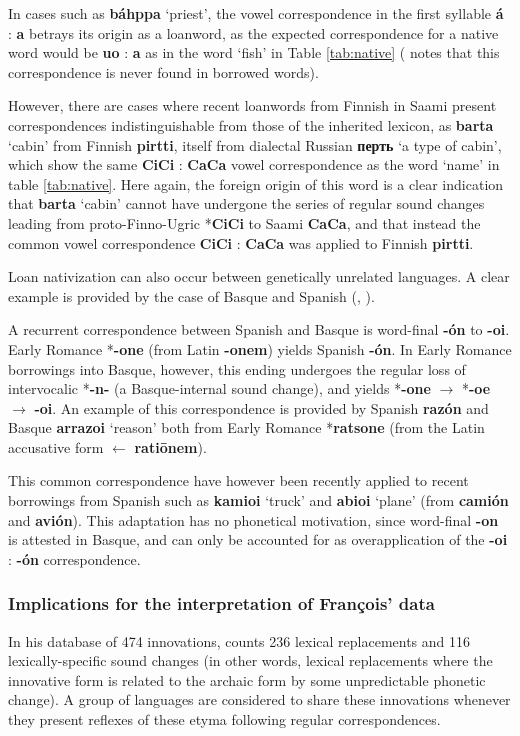 \documentclass[svgnames,12pt]{scrartcl}
\newcommand{\ipa}[1]{\textbf{{\phon\mbox{#1}}}}
\begin{document}
{{In cases such as \ipa{báhppa} `priest', the vowel correspondence in the first syllable \ipa{á} : \ipa{a} betrays its origin as a loanword, as the expected correspondence for a native word would be \ipa{uo} : \ipa{a} as in the word `fish' in Table \ref{tab:native} (\citealt[35]{aikio06nativization} notes that this correspondence is never found in borrowed words).

However, there are cases where recent loanwords from Finnish in Saami present correspondences indistinguishable from those of the inherited lexicon, as \ipa{barta} `cabin' from Finnish \ipa{pirtti}, itself from dialectal Russian \ipa{перть} `a type of cabin', which show the same \ipa{CiCi} : \ipa{CaCa} vowel correspondence as the word `name' in table \ref{tab:native}. Here again, the foreign origin of this word is a clear indication that \ipa{barta} `cabin' cannot have undergone the series of regular sound changes leading from proto-Finno-Ugric *\ipa{CiCi} to Saami \ipa{CaCa}, and that instead the common vowel correspondence \ipa{CiCi} : \ipa{CaCa} was applied to Finnish \ipa{pirtti}.

 
Loan nativization can also occur between genetically unrelated languages. A clear example is provided by the case of Basque and Spanish (\citealt[53-54]{trask00chronology}, \citealt[21-3]{aikio06nativization}). 

A recurrent correspondence between Spanish and Basque is word-final \ipa{-ón} to \ipa{-oi}. Early Romance *\ipa{-one} (from Latin \ipa{-onem}) yields Spanish \ipa{-ón}. In Early Romance borrowings into Basque, however, this ending undergoes the regular loss of intervocalic *\ipa{-n-} (a Basque-internal sound change), and yields *\ipa{-one} $\rightarrow$ *\ipa{-oe} $\rightarrow$ \ipa{-oi}. An example of this correspondence is provided by Spanish \ipa{razón} and Basque \ipa{arrazoi} `reason' both from Early Romance *\ipa{ratsone} (from the Latin accusative form $\leftarrow$ \ipa{ratiōnem}).

This common correspondence have however been recently applied to recent borrowings from Spanish such as \ipa{kamioi} `truck' and \ipa{abioi} `plane' (from \ipa{camión} and \ipa{avión}). This adaptation has no phonetical motivation, since word-final \ipa{-on} is attested in Basque, and can only be accounted for as overapplication of the \ipa{-oi} : \ipa{-ón} correspondence.



\subsubsection{Implications for the interpretation of François' data}
In his database of 474 innovations, \citet[177]{Francois2015} counts 236 lexical replacements and 116 lexically-specific sound changes (in other words, lexical replacements where the innovative form is related to the archaic form by some unpredictable phonetic change). A group of languages are considered to share these innovations whenever they present reflexes of these etyma following regular correspondences.

}}
\end{document}
